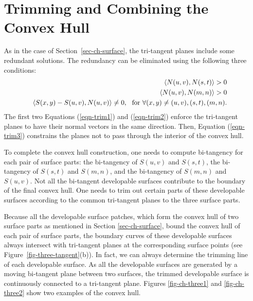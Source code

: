 \documentclass[doublespacing]{elsart}
\begin{document}
\section{Trimming and Combining the Convex Hull}
\label{sec-trim-combine}

As in the case of Section~\ref{sec-ch-surface}, the tri-tangent planes
include some redundant solutions.
The redundancy can be eliminated using the following three conditions:
\begin{eqnarray}
& & \left<{N(u,v)}, {N(s,t)} \right> > 0 \label{eqn-trim1} \\
& & \left<{N(u,v)}, {N(m,n)} \right> > 0 \label{eqn-trim2} \\
& & \left<{S(x,y) - S(u,v)}, {N(u,v)} \right> \neq 0,\ \textrm{ for } 
\forall (x,y) \neq (u,v), (s,t), (m,n). \label{eqn-trim3}
\end{eqnarray}
The first two Equations (\ref{eqn-trim1}) and (\ref{eqn-trim2}) enforce 
the tri-tangent planes to have their normal vectors in the same direction. 
Then, Equation (\ref{eqn-trim3}) constrains the planes
not to pass through the interior of the convex hull.

To complete the convex hull construction, one needs to compute 
bi-tangency for each pair of surface parts: the bi-tangency of $S(u,v)$ and 
$S(s,t)$, the bi-tangency of $S(s,t)$ and $S(m,n)$, and the bi-tangency
of $S(m,n)$ and $S(u,v)$. Not all the bi-tangent developable surfaces
contribute to the boundary of the final convex hull. One needs to trim out
certain parts of these developable surfaces according to
the common tri-tangent planes to the three surface parts.

Because all the developable surface patches, which form the convex hull of 
two surface parts as mentioned in Section \ref{sec-ch-surface}, bound
the convex hull of each pair of surface parts, the boundary curves of these 
developable surfaces always intersect with tri-tangent planes
at the corresponding surface points (see Figure~\ref{fig-three-tangent}(b)).
In fact, we can always determine the trimming line of each developable surface.
As all the developable surfaces are generated by a moving bi-tangent plane 
between two surfaces, the trimmed developable surface is continuously 
connected to a tri-tangent plane.
Figures \ref{fig-ch-three1} and \ref{fig-ch-three2} show
two examples of the convex hull.
\end{document}
